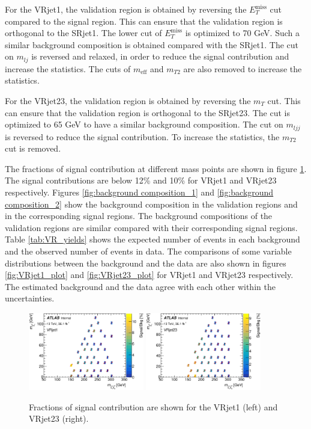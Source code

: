 For the VRjet1, the validation region is obtained by reversing the $E_T^{\text{miss}}$ cut compared to the signal region.
This can ensure that the validation region is orthogonal to the SRjet1.
The lower cut of $E_T^{\text{miss}}$ is optimized to 70 GeV.
Such a similar background composition is obtained compared with the SRjet1.
The cut on $m_{lj}$ is reversed and relaxed, in order to reduce the signal contribution and increase the statistics.
The cuts of $m_{\text{eff}}$ and $m_{T2}$ are also removed to increase the statistics.

For the VRjet23, the validation region is obtained by reversing the $m_T$ cut.
This can ensure that the validation region is orthogonal to the SRjet23.
The cut is optimized to 65 GeV to have a similar background composition.
The cut on $m_{ljj}$ is reversed to reduce the signal contribution.
To increase the statistics, the $m_{T2}$ cut is removed.

The fractions of signal contribution at different mass points are shown in figure \ref{fig:signal_contribution_VR}. The signal contributions are below 12\% and 10\% for VRjet1 and VRjet23 respectively.
Figures \ref{fig:background composition_1} and \ref{fig:background composition_2} show the background composition in the validation regions and in the corresponding signal regions.
The background compositions of the validation regions are similar compared with their corresponding signal regions.
Table \ref{tab:VR_yields} shows the expected number of events in each background and the observed number of events in data.
The comparisons of some variable distributions between the background and the data are also shown in figures \ref{fig:VRjet1_plot} and \ref{fig:VRjet23_plot} for VRjet1 and VRjet23 respectively.
The estimated background and the data agree with each other within the uncertainties.

\begin{figure}[htbp]
\centering
\includegraphics[width=0.45\textwidth]{data/plot/VR/SignalContamination_VRjet1.eps}
\includegraphics[width=0.45\textwidth]{data/plot/VR/SignalContamination_VRjet23.eps}
\caption{Fractions of signal contribution are shown for the VRjet1 (left) and VRjet23 (right).}
\label{fig:signal_contribution_VR}
\end{figure}

